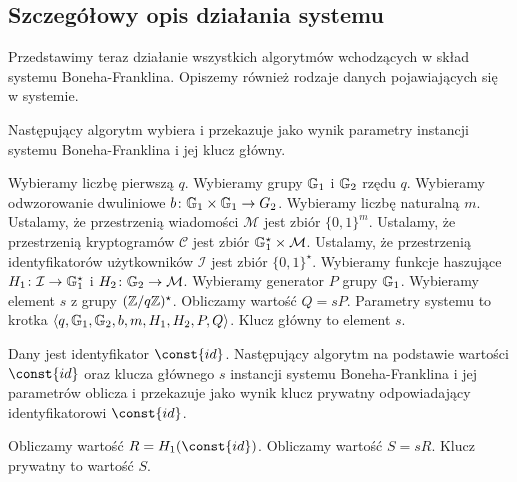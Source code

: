\subsection*{Szczegółowy opis działania systemu}

\noindent
Przedstawimy teraz działanie wszystkich algorytmów
wchodzących w skład systemu Boneha-Franklina.
Opiszemy również rodzaje danych pojawiających się w systemie.

\begin{algorithm}
Następujący algorytm wybiera i przekazuje jako wynik
parametry instancji systemu Boneha-Franklina
i jej klucz główny.

\begin{codebox}
\li
Wybieramy
liczbę pierwszą $q$.
\li
Wybieramy grupy $\mathbb{G}_1$ i $\mathbb{G}_2$ rzędu $q$.
\li
Wybieramy odwzorowanie dwuliniowe $b\colon \mathbb{G}_1 \times \mathbb{G}_1 \to G_2$.
\li
Wybieramy liczbę naturalną $m$.
\li
Ustalamy, że przestrzenią wiadomości $\mathcal{M}$
jest zbiór $\{0, 1\}^m$.
\li
Ustalamy, że przestrzenią kryptogramów $\mathcal{C}$
jest zbiór $\mathbb{G}_1^\star \times \mathcal{M}$.
\li
Ustalamy, że przestrzenią identyfikatorów użytkowników $\mathcal{I}$
jest zbiór $\{0, 1\}^\star$.
\li
Wybieramy funkcje haszujące
$H_1\colon \mathcal{I} \to \mathbb{G}_1^\star$
i $H_2\colon \mathbb{G}_2 \to \mathcal{M}$.
\li
Wybieramy generator $P$ grupy $\mathbb{G}_1$.
\li
Wybieramy element $s$ z grupy $(\mathbb{Z} / q\mathbb{Z})^\star$.
\li
Obliczamy wartość $Q = sP$.
\li
Parametry systemu to krotka
$\left\langle q, \mathbb{G}_1, \mathbb{G}_2, b, m, H_1, H_2, P, Q \right\rangle$.
\li
Klucz główny to element $s$.
\end{codebox}
\end{algorithm}

\begin{algorithm}
Dany jest identyfikator $\const{id}$.
Następujący algorytm na podstawie wartości $\const{id}$
oraz klucza głównego $s$ instancji systemu Boneha-Franklina i jej parametrów
oblicza i przekazuje jako wynik
klucz prywatny odpowiadający identyfikatorowi $\const{id}$.

\begin{codebox}
\li
Obliczamy wartość $R = H_1(\const{id})$.
\li
Obliczamy wartość $S = sR$.
\li
Klucz prywatny to wartość $S$.
\end{codebox}
\end{algorithm}

